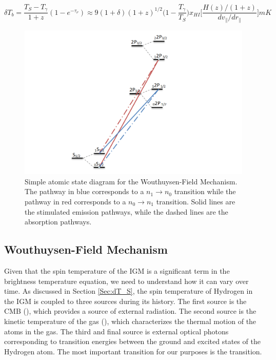 \begin{equation}\label{Eq:dT_b}
\delta T_b = \frac{T_S - T_\gamma}{1+z}(1-e^{-\tau_\nu}) \approx 9 (1+\delta) (1+z)^{1/2} \Big(1-\frac{T_\gamma}{T_S}\Big) x_{HI} \Big[ \frac{H(z)/(1+z)}{dv_{\parallel}/dr_{\parallel}} \Big] mK
\end{equation}



\begin{figure}[htb]
\begin{center}
\includegraphics[width=0.95\linewidth]{Introduction/figures/wfm_states.png}
\caption{Simple atomic state diagram for the Wouthuysen-Field Mechanism. The pathway in blue corresponds to a $n_1 \rightarrow n_0$ transition while the pathway in red corresponds to a $n_0 \rightarrow n_1$ transition. Solid lines are the stimulated emission pathways, while the dashed lines are the absorption pathways.}
\label{Fig:wfm_states}
\end{center}
\end{figure}


\subsection{Wouthuysen-Field Mechanism}\label{Sec:WFM}

Given that the spin temperature of the IGM is a significant term in the brightness temperature equation, we need to understand how it can vary over time. As discussed in Section \ref{Sec:dT_S}, the spin temperature of Hydrogen in the IGM is coupled to three sources during its history. The first source is the CMB (\tg), which provides a source of external \cm radiation. The second source is the kinetic temperature of the gas (\tk), which characterizes the thermal motion of the atoms in the gas. The third and final source is external optical photons corresponding to transition energies between the ground and excited states of the Hydrogen atom. The most important transition for our purposes is the \lya transition. 

